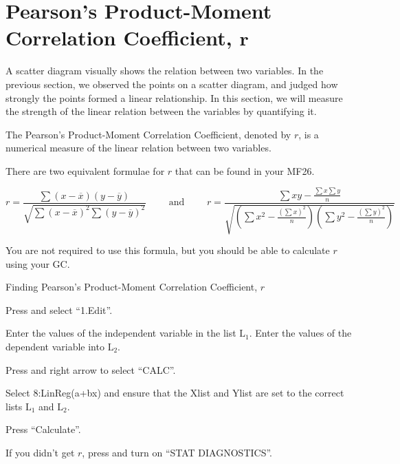 \documentclass[11pt,a4paper]{book}
\begin{document}
\newpage

\section{Pearson's Product-Moment Correlation Coefficient, $\boldsymbol{r}$}

A scatter diagram visually shows the relation between two variables.
In the previous section, we observed the points on a scatter diagram,
and judged how strongly the points formed a linear relationship. In
this section, we will measure the strength of the linear relation between
the variables by quantifying it.

The Pearson's Product-Moment Correlation Coefficient, denoted by $r$,
is a numerical measure of the linear relation between two variables.

There are two equivalent formulae for $r$ that can be found in your
MF26.

\[
r=\frac{\sum\left(x-\overline{x}\right)\left(y-\overline{y}\right)}{\sqrt{\sum\left(x-\overline{x}\right)^{2}\sum\left(y-\overline{y}\right)^{2}}}\qquad\text{ and }\qquad r=\frac{\sum xy-\frac{\sum x\sum y}{n}}{\sqrt{\left(\sum x^{2}-\frac{\left(\sum x\right)^{2}}{n}\right)\left(\sum y^{2}-\frac{\left(\sum y\right)^{2}}{n}\right)}}
\]

You are not required to use this formula, but you should be able to
calculate $r$ using your GC.


\begin{GC}{Finding Pearson's Product-Moment Correlation Coefficient, $r$}

\begin{steps}[leftmargin=1.5cm]

\item  Press \tcbox[box align=base,nobeforeafter,colback=black, colframe=black,size=small]{\textbf{\textcolor{white}{stat}}}
and select ``1.Edit''.

\item  Enter the values of the independent variable in the list $\text{L}_{1}$.
Enter the values of the dependent variable into $\text{L}_{2}$.

\item  Press \tcbox[box align=base,nobeforeafter,colback=black, colframe=black,size=small]{\textbf{\textcolor{white}{stat}}}
and right arrow to select ``CALC''.

\item  Select 8:LinReg(a+bx) and ensure that the Xlist and Ylist
are set to the correct lists $\text{L}_{1}$ and $\text{L}_{2}$.

\item Press ``Calculate''.

\end{steps}

If you didn't get $r$, press \tcbox[box align=base,nobeforeafter,colback=black, colframe=black,size=small]{\textbf{\textcolor{white}{mode}}}
and turn on ``STAT DIAGNOSTICS\textquotedblright .

\end{GC}
\end{document}
